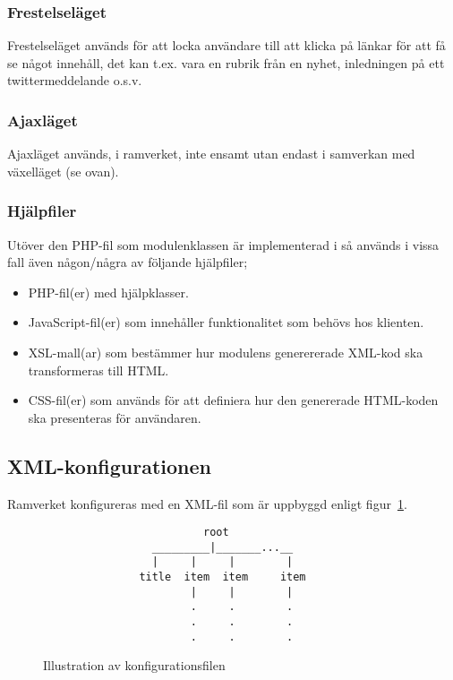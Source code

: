 \subsubsection{Frestelseläget}
Frestelseläget används för att locka användare till att klicka på länkar för att
få se något innehåll, det kan t.ex. vara en rubrik från en nyhet, inledningen på
ett twittermeddelande o.s.v.

\subsubsection{Ajaxläget}
Ajaxläget används, i ramverket, inte ensamt utan endast i samverkan med
växelläget (se ovan).

\subsubsection{Hjälpfiler}
Utöver den PHP-fil som modulenklassen är implementerad i så används i vissa fall
även någon/några av följande hjälpfiler;

\begin{itemize}
  \item PHP-fil(er) med hjälpklasser.
  \item JavaScript-fil(er) som innehåller funktionalitet som behövs hos
    klienten.
  \item XSL-mall(ar) som bestämmer hur modulens generererade XML-kod ska
    transformeras till HTML.
  \item CSS-fil(er) som används för att definiera hur den genererade HTML-koden
    ska presenteras för användaren.
\end{itemize}

\subsection{XML-konfigurationen}
Ramverket konfigureras med en XML-fil som är uppbyggd enligt
figur~\ref{fig:xml-config}.

\begin{figure}[h]
\begin{verbatim}
                         root
                 _________|_______...__
                 |     |     |        |
               title  item  item     item
                       |     |        |
                       .     .        .
                       .     .        .
                       .     .        .
\end{verbatim}
\caption{Illustration av konfigurationsfilen}
\label{fig:xml-config}
\end{figure}

